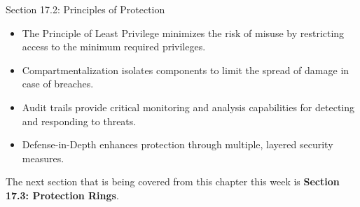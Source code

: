 \begin{notes}{Section 17.2: Principles of Protection}
    \begin{highlight}
        \begin{itemize}
            \item The Principle of Least Privilege minimizes the risk of misuse by restricting access to the minimum required privileges.
            \item Compartmentalization isolates components to limit the spread of damage in case of breaches.
            \item Audit trails provide critical monitoring and analysis capabilities for detecting and responding to threats.
            \item Defense-in-Depth enhances protection through multiple, layered security measures.
        \end{itemize}
    \end{highlight}
\end{notes}

The next section that is being covered from this chapter this week is \textbf{Section 17.3: Protection Rings}.

